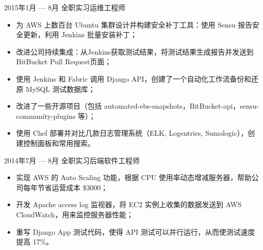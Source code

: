 \documentclass{resume}
\begin{document}
\smallskip
\begin{body}
	{2015年1月 --- 8月}
	{全职实习运维工程师}
	\begin{itemize}[noitemsep,topsep=0pt]
		\item 为 AWS 上数百台 Ubuntu 集群设计并构建安全补丁工具：使用 Sensu 报告安全更新，利用 Jenkins 批量安装补丁；
		\item 改进公司持续集成：从Jenkins获取测试结果，将测试结果生成报告并发送到BitBucket Pull Request页面；
		\item 使用 Jenkins 和 Fabric 调用 Django API，创建了一个自动化工作流备份和还原 MySQL 测试数据库；
		\item 改进了一些开源项目（包括 automated-ebs-snapshots，BitBucket-api，sensu-community-plugins 等）；
		\item 使用 Chef 部署并对比几款日志管理系统（ELK, Logentries, Sumologic），创建控制面板和常用搜索。
	\end{itemize}
\end{body}

\smallskip
\begin{body}
	{2014年7月 --- 8月}
	{全职实习后端软件工程师}
	\begin{itemize}[noitemsep,topsep=0pt]
		\item 实现 AWS 的 Auto Scaling 功能，根据 CPU 使用率动态增减服务器，帮助公司每年节省运营成本 \$3000；
		\item 开发 Apache access log 监视器，将 EC2 实例上收集的数据发送到 AWS CloudWatch，用来监控服务器性能；
		\item 重写 Django App 测试代码，使得 API 测试可以并行运行，从而使测试速度提高 17\%。
	\end{itemize}
\end{body}

\smallskip

\end{document}
